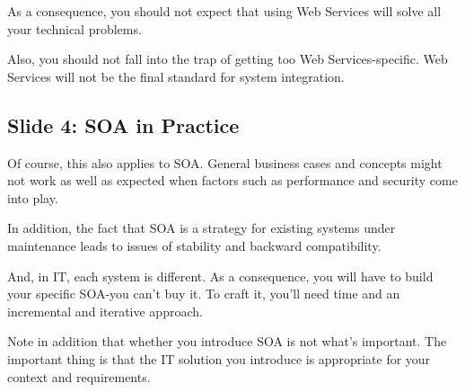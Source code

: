 \documentclass[11pt]{report}
\begin{document}
As a consequence, you should not expect that using Web Services will solve all your technical problems.

Also, you should not fall into the trap of getting too Web Services-specific. Web Services will not be the final standard for system integration.

\subsection{Slide 4: SOA in Practice}
Of course, this also applies to SOA. General business cases and concepts might not work as well as expected when factors such as performance and security come into play.

In addition, the fact that SOA is a strategy for existing systems under maintenance leads to issues of stability and backward compatibility.

And, in IT, each system is different. As a consequence, you will have to build your specific SOA-you can't buy it. To craft it, you'll need time and an incremental and iterative approach.

Note in addition that whether you introduce SOA is not what's important. The important thing is that the IT solution you introduce is appropriate for your context and requirements.
\end{document}
